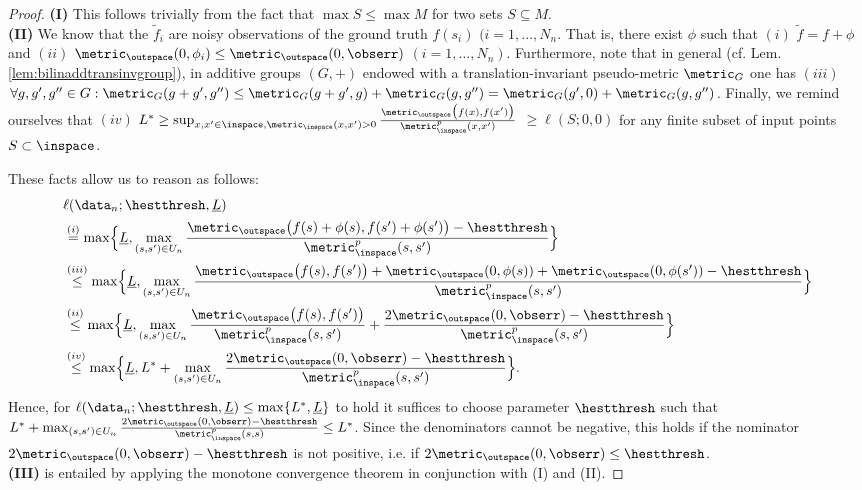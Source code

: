 \begin{proof}
\textbf{(I)} This follows trivially from the fact that $\max S \leq \max M$ for two sets $S \subseteq M$. \\
\textbf{(II) }
We know that the $\tilde f_i$ are noisy observations of the ground truth $f(s_i)$ $(i=1,...,N_n$. That is, there exist $\phi$ such that $(i)$ $\tilde f = f + \phi$  and $(ii)$ $\metric_\outspace(0,\phi_i) \leq \metric_\outspace(0,\obserr)$ $(i =1,\ldots, N_n)$. 
Furthermore, note that in general (cf. Lem. \ref{lem:bilinaddtransinvgroup}), in additive groups $(G,+)$ endowed with a translation-invariant pseudo-metric $\metric_G$ one has $(iii)$ $\forall g,g',g'' \in G: \metric_G (g+g',g'') \leq \metric_G (g+g',g)+\metric_G(g,g'') = \metric_G (g',0)+\metric_G (g,g'')$. Finally, we remind ourselves that $(iv)$ $L^* \geq \sup_{x,x' \in \inspace, \metric_\inspace(x,x')>0} \frac{\metric_\outspace\bigl(f(x),f(x') \bigr)}{\metric_{\inspace}^p(x,x')}$ $\geq \ell(S;0,0)$ for any finite subset of input points $S \subset \inspace$.

These facts allow us to reason as follows:
\begin{align}
&\ell(\data_n;\hestthresh,\underline L)  %
\\
 &\stackrel{(i)}{=} \max \Bigl\{ \underline L, \max_{(s,s') \in U_n} \frac{\metric_\outspace\bigl( f(s) + \phi(s),f(s')+\phi(s')\bigr) - \hestthresh}{\metric_{\inspace}^p(s,s')} \Bigr\}\\
  &\stackrel{(iii)}{\leq} \max \Bigl\{ \underline L, \max_{(s,s') \in U_n} \frac{\metric_\outspace\bigl( f(s),f(s') \bigr)  + \metric_\outspace(0,\phi(s)) + \metric_\outspace(0,\phi(s')) - \hestthresh}{\metric_{\inspace}^p(s,s')} \Bigr\}\\
    &\stackrel{(ii)}{\leq} \max \Bigl\{ \underline L,  \max_{(s,s') \in U_n} \frac{\metric_\outspace\bigl( f(s),f(s') \bigr)  }{\metric_{\inspace}^p(s,s')} +\frac{2 \metric_\outspace(0,\obserr) - \hestthresh}{\metric_{\inspace}^p(s,s')} \Bigr\}\\
        &\stackrel{(iv)}{\leq}  \max \Bigl\{ \underline L, L^* +\max_{(s,s') \in U_n} \frac{2 \metric_\outspace(0,\obserr) - \hestthresh}{\metric_{\inspace}^p(s,s')} \Bigr\}.
\end{align} 
Hence, for $\ell(\data_n;\hestthresh,\underline L) \leq \max\{L^*,\underline L\}$ to hold it suffices to choose parameter $\hestthresh$ such that \newline
%
$L^* +\max_{(s,s') \in U_n}  \frac{2 \metric_\outspace(0,\obserr) - \hestthresh}{\metric_{\inspace}^p(s,s)} \leq L^*$.
Since the denominators cannot be negative, this holds if the nominator $2 \metric_\outspace(0,\obserr) - \hestthresh$ is not positive, i.e. if $2 \metric_\outspace(0,\obserr) \leq \hestthresh$. \\
\textbf{(III)} is entailed by applying the monotone convergence theorem in conjunction with (I) and (II).
\end{proof}

